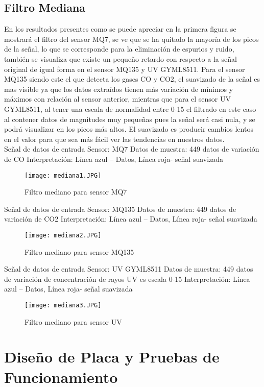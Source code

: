\documentclass[10pt,a4paper]{article}
\begin{document}
\subsection{Filtro Mediana}
En los resultados presentes como se puede apreciar en la primera figura se mostrará el filtro del sensor MQ7, se ve que se ha quitado la mayoría de los picos de la señal, lo que se corresponde para la eliminación de espurios y ruido, también se visualiza que existe un pequeño retardo con respecto a la señal original de igual forma en el sensor MQ135 y UV GYML8511.
Para el sensor MQ135 siendo este el que detecta los gases CO y CO2, el suavizado de la señal es mas visible ya que los datos extraídos tienen más variación de mínimos y máximos con relación al sensor anterior, mientras que para el sensor UV GYML8511, al tener una escala de normalidad entre 0-15 el filtrado en este caso al contener datos de magnitudes muy pequeñas pues la señal será casi nula, y se podrá visualizar en los picos más altos. El suavizado es producir cambios lentos en el valor para que sea más fácil ver las tendencias en nuestros datos.\\

Señal de datos de entrada 
Sensor: MQ7  Datos de muestra: 449 datos de variación de CO
Interpretación:  Línea azul – Datos, Línea roja- señal suavizada 

\begin{figure}[H]
\centering
\texttt{[image: mediana1.JPG]}
 \caption{Filtro mediano para sensor MQ7} 
\end{figure} 

Señal de datos de entrada 
Sensor: MQ135  Datos de muestra: 449 datos de variación de CO2
Interpretación:  Línea azul – Datos, Línea roja- señal suavizada 

\begin{figure}[H]
\centering
\texttt{[image: mediana2.JPG]}
 \caption{Filtro mediano para sensor MQ135} 
\end{figure} 

Señal de datos de entrada 
Sensor: UV GYML8511 		
Datos de muestra: 449 datos de variación de concentración de rayos UV es escala 0-15
Interpretación: Línea azul – Datos, Línea roja- señal suavizada 

\begin{figure}[H]
\centering
\texttt{[image: mediana3.JPG]}
 \caption{Filtro mediano para sensor UV} 
\end{figure} 


\section{Diseño de Placa y Pruebas de Funcionamiento}
\end{document}
